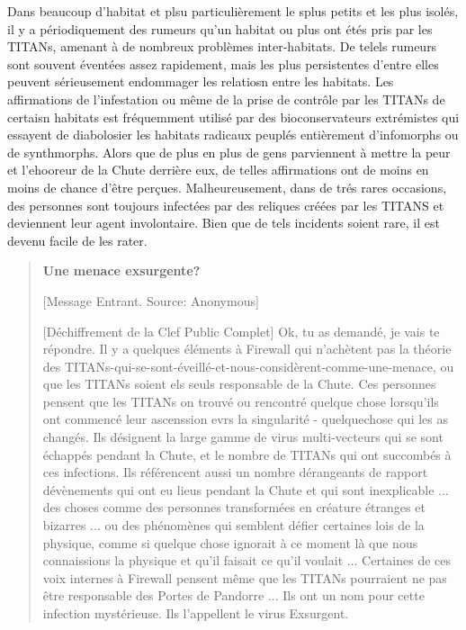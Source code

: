 Dans beaucoup d'habitat et plsu particulièrement le splus petits et les plus isolés,  il y a périodiquement des rumeurs qu'un habitat ou plus ont étés pris par les TITANs, amenant à de nombreux problèmes inter-habitats. De telels rumeurs sont souvent éventées assez rapidement, mais les plus persistentes d'entre elles peuvent sérieusement endommager les relatiosn entre les habitats. Les affirmations de l'infestation ou même de la prise de contrôle par les TITANs de certaisn habitats est fréquemment utilisé par des bioconservateurs extrémistes qui essayent de diabolosier les habitats radicaux peuplés entièrement d'infomorphs ou de synthmorphs. Alors que de plus en plus de gens parviennent à mettre la peur et l'ehooreur de la Chute derrière eux, de telles affirmations ont de moins en moins de chance d'être perçues. Malheureusement, dans de trés rares occasions, des personnes sont toujours infectées par des reliques créées par les TITANS et deviennent leur agent involontaire. Bien que de tels incidents soient rare, il est devenu facile de les rater. 

\begin{quotation} \textbf{Une menace exsurgente?} 

[Message Entrant. Source: Anonymous] 

[Déchiffrement de la Clef Public Complet] Ok, tu as demandé, je vais te répondre. Il y a quelques éléments à Firewall qui n'achètent pas la théorie des TITANs-qui-se-sont-éveillé-et-nous-considèrent-comme-une-menace, ou que les TITANs soient els seuls responsable de la Chute. Ces personnes pensent que les TITANs on trouvé ou rencontré quelque chose lorsqu'ils ont commencé leur ascenssion evrs la singularité - quelquechose qui les as changés. Ils désignent la large gamme de virus multi-vecteurs qui se sont échappés pendant la Chute, et le nombre de TITANs qui ont succombés à ces infections. Ils référencent aussi un nombre dérangeants de rapport dévènements qui ont eu lieus pendant la Chute et qui sont inexplicable ... des choses comme des personnes transformées en créature étranges et bizarres ... ou des phénomènes qui semblent défier certaines lois de la physique, comme si quelque chose ignorait à ce moment là que nous connaissions la physique et qu'il faisait ce qu'il voulait ... Certaines de ces voix internes à Firewall pensent même que les TITANs pourraient ne pas être responsable des Portes de Pandorre ... Ils ont un nom pour cette infection mystérieuse. Ils l'appellent le virus Exsurgent. \end{quotation} 

